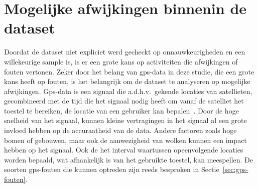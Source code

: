 
\section{Mogelijke afwijkingen binnenin de dataset}
Doordat de dataset niet expliciet werd gecheckt op onnauwkeurigheden en een
willekeurige sample is, is er een grote kans op activiteiten die afwijkingen of
fouten vertonen. Zeker door het belang van \ac{gps}-data in deze studie, die
een grote kans heeft op fouten, is het belangrijk om de dataset te analyseren
op mogelijke afwijkingen. Gps-data is een signaal die a.d.h.v.\ gekende
locaties van satellieten, gecombineerd met de tijd die het signaal nodig heeft
om vanaf de satelliet het toestel te bereiken, de locatie van een gebruiker kan
bepalen~\cite{BadGPSDa19:online}. Door de hoge snelheid van het signaal, kunnen
kleine vertragingen in het signaal al een grote invloed hebben op de
accuraatheid van de data. Andere factoren zoals hoge bomen of gebouwen, maar
ook de aanwezigheid van wolken kunnen een impact hebben op het signaal. Ook de
het interval waartussen opeenvolgende locaties worden bepaald, wat afhankelijk
is van het gebruikte toestel, kan meespellen. De soorten \ac{gps}-fouten die
kunnen optreden zijn reeds besproken in Sectie~\ref{sec:gps-fouten}.

